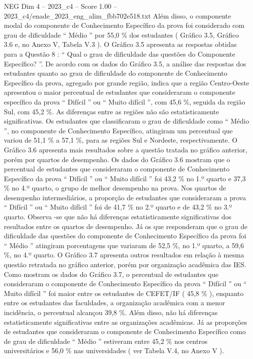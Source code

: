 \begin{textsample}{NEG Dim 4 – 2023\_c4 – Score 1.00 – 2023\_c4/enade\_2023\_eng\_alim\_fbb702e518.txt}
Além disso, o componente modal do componente de Conhecimento Específico da prova foi considerado com grau de dificuldade “ Médio ” por 55,0 \% dos estudantes ( Gráfico 3.5, Gráfico 3.6 e, no Anexo V, Tabela V.3 ).
O Gráfico 3.5 apresenta as respostas obtidas para a Questão 8 : “ Qual o grau de dificuldade das questões do Componente Específico? ”.
De acordo com os dados do Gráfico 3.5, a análise das respostas dos estudantes quanto ao grau de dificuldade do componente de Conhecimento Específico da prova, agregado por grande região, indica que a região Centro-Oeste apresentou o maior percentual de estudantes que consideraram o componente específico da prova “ Difícil ” ou “ Muito difícil ”, com 45,6 \%, seguida da região Sul, com 45,2 \%.
As diferenças entre as regiões não são estatisticamente significativas.
Os estudantes que classificaram o grau de dificuldade como “ Médio ”, no componente de Conhecimento Específico, atingiram um percentual que variou de 51,1 \% a 57,1 \%, para as regiões Sul e Nordeste, respectivamente.
O Gráfico 3.6 apresenta mais resultados sobre a questão tratada no gráfico anterior, porém por quartos de desempenho.
Os dados do Gráfico 3.6 mostram que o percentual de estudantes que consideraram o componente de Conhecimento Específico da prova “ Difícil ” ou “ Muito difícil ” foi 43,2 \% no 1.º quarto e 37,3 \% no 4.º quarto, o grupo de melhor desempenho na prova.
Nos quartos de desempenho intermediários, a proporção de estudantes que consideraram a prova “ Difícil ” ou “ Muito difícil ” foi de 41,7 \% no 2.º quarto e de 43,2 \% no 3.º quarto.
Observa -se que não há diferenças estatisticamente significativas dos resultados entre os quartos de desempenho.
Já os que responderam que o grau de dificuldade das questões do componente de Conhecimento Específico da prova foi “ Médio ” atingiram porcentagens que variaram de 52,5 \%, no 1.º quarto, a 59,6 \%, no 4.º quarto.
O Gráfico 3.7 apresenta outros resultados em relação à mesma questão retratada no gráfico anterior, porém por organização acadêmica das IES.
Como mostram os dados do Gráfico 3.7, o percentual de estudantes que consideraram o componente de Conhecimento Específico da prova “ Difícil ” ou “ Muito difícil ” foi maior entre os estudantes de CEFET/IF ( 45,8 \% ), enquanto entre os estudantes das faculdades, a organização acadêmica com a menor incidência, o percentual alcançou 39,8 \%.
Além disso, não há diferenças estatisticamente significativas entre as organizações acadêmicas.
Já as proporções de estudantes que consideraram o componente de Conhecimento Específico como de grau de dificuldade “ Médio ” estiveram entre 45,2 \% nos centros universitários e 56,0 \% nas universidades ( ver Tabela V.4, no Anexo V ).

\end{textsample}
